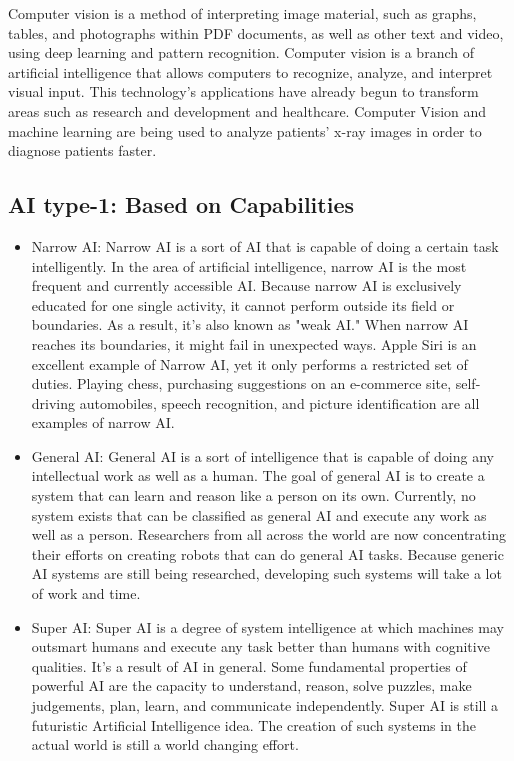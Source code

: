 \documentclass[conference]{IEEEtran}
\begin{document}
Computer vision is a method of interpreting image material, such as graphs, tables, and photographs within PDF documents, as well as other text and video, using deep learning and pattern recognition. Computer vision is a branch of artificial intelligence that allows computers to recognize, analyze, and interpret visual input. This technology's applications have already begun to transform areas such as research and development and healthcare. Computer Vision and machine learning are being used to analyze patients' x-ray images in order to diagnose patients faster.


\subsection{AI type-1: Based on Capabilities}
\begin{itemize}



\item Narrow AI: Narrow AI is a sort of AI that is capable of doing a certain task intelligently. In the area of artificial intelligence, narrow AI is the most frequent and currently accessible AI. Because narrow AI is exclusively educated for one single activity, it cannot perform outside its field or boundaries. As a result, it's also known as "weak AI." When narrow AI reaches its boundaries, it might fail in unexpected ways. Apple Siri is an excellent example of Narrow AI, yet it only performs a restricted set of duties.  Playing chess, purchasing suggestions on an e-commerce site, self-driving automobiles, speech recognition, and picture identification are all examples of narrow AI.
\item General AI: General AI is a sort of intelligence that is capable of doing any intellectual work as well as a human. The goal of general AI is to create a system that can learn and reason like a person on its own. Currently, no system exists that can be classified as general AI and execute any work as well as a person. Researchers from all across the world are now concentrating their efforts on creating robots that can do general AI tasks. Because generic AI systems are still being researched, developing such systems will take a lot of work and time.
\item Super AI: Super AI is a degree of system intelligence at which machines may outsmart humans and execute any task better than humans with cognitive qualities. It's a result of AI in general. Some fundamental properties of powerful AI are the capacity to understand, reason, solve puzzles, make judgements, plan, learn, and communicate independently. Super AI is still a futuristic Artificial Intelligence idea. The creation of such systems in the actual world is still a   world changing effort.

\end{itemize}
\end{document}
